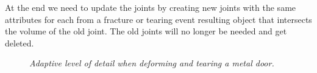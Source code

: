 \documentclass[
	11pt, 
	DIV10,
	a4paper, 
	oneside, 
	headings=normal, 
	captions=tableheading,
	final, 
	numbers=noenddot
]{scrartcl}
\begin{document}
	At the end we need to update the joints by creating new joints with the same attributes for each from a fracture or tearing event resulting object that intersects the volume of the old joint. The old joints will no longer be needed and get deleted.
	\begin{figure}[H]
		\centering
		\caption[caption]{\label{Door} \textit{Adaptive level of detail when deforming and tearing a metal door.} \footnotemark[1]}
	\end{figure}
\end{document}
